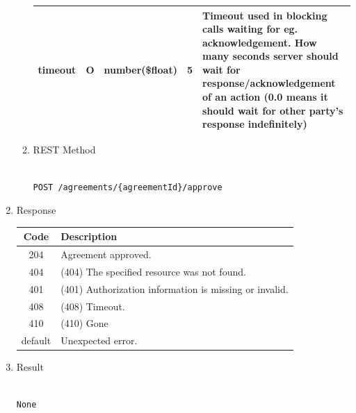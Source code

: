 \begin{enumerate}
\begin{enumerate}
\begin{center}
\begin{tabular}{|p{3cm}|l|p{3cm}|p{3cm}|p{4cm}|}
timeout			& O & 	number(\$float)		&	5 	&  Timeout used in blocking calls waiting for eg. acknowledgement. 
														How many seconds server should wait for response/acknowledgement of an action 
														(0.0 means it should wait for other party's response indefinitely) \\
\hline
\end{tabular}
\end{center}

\item REST Method

\begin{tcolorbox}[boxrule=0pt, frame empty]
\begin{verbatim} 

POST /agreements/{agreementId}/approve

\end{verbatim}
\end{tcolorbox}

\end{enumerate}

\item Response

\begin{center}
\begin{tabular}{|c|l|} 
\hline
\rowcolor{lightgray}	Code 		& 	Description \\
\hline
204	 		&	Agreement approved. \\
\hline
404			&	(404) The specified resource was not found. \\
\hline
401			&	(401) Authorization information is missing or invalid. \\
\hline
408			&	(408) Timeout. \\
\hline
410			&	(410) Gone \\
\hline
default		&	Unexpected error. \\
\hline
\end{tabular}
\end{center}

\item Result

\begin{tcolorbox}[boxrule=0pt, frame empty]
\begin{verbatim}

None

\end{verbatim}
\end{tcolorbox}


\end{enumerate}
